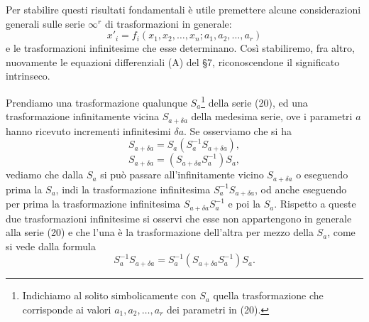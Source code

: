 \documentclass[11pt]{book}
\begin{document}
Per stabilire questi risultati fondamentali è utile premettere alcune considerazioni generali sulle serie $\infty^r$ di trasformazioni in generale:
\begin{equation*}\tag{20}
 x'_i=f_i(x_1,x_2,\ldots,x_n; a_1,a_2,\ldots,a_r)
\end{equation*}
e le trasformazioni infinitesime che esse determinano. Così stabiliremo, fra altro, nuovamente le equazioni differenziali (A) del \S{}7, riconoscendone il significato intrinseco.

Prendiamo una trasformazione qualunque $S_a$\footnote{Indichiamo al solito simbolicamente con $S_a$ quella trasformazione che corrisponde ai valori $a_1,a_2,\ldots,a_r$ dei parametri in (20).} della serie (20), ed una trasformazione infinitamente vicina $S_{a+\delta a}$ della medesima serie, ove i parametri $a$ hanno ricevuto incrementi infinitesimi $\delta a$. Se osserviamo che si ha
\[
 S_{a+\delta a}=S_a(S_a^{-1}S_{a+\delta a}),
\]
\[
 S_{a+\delta a}=(S_{a+\delta a}S_a^{-1})S_a,
\]
vediamo che dalla $S_a$ si può passare all'infinitamente vicino $S_{a+\delta a}$ o eseguendo prima la $S_a$, indi la trasformazione infinitesima $S_a^{-1}S_{a+\delta a}$, od anche eseguendo per prima la trasformazione infinitesima $S_{a+\delta a}S_a^{-1}$ e poi la $S_a$. Rispetto a queste due trasformazioni infinitesime si osservi che esse non appartengono in generale alla serie (20) e che l'una è la trasformazione dell'altra per mezzo della $S_a$, come si vede dalla formula
\[
 S_a^{-1}S_{a+\delta a}=S_a^{-1}(S_{a+\delta a}S_a^{-1})S_a.
\]
\end{document}

